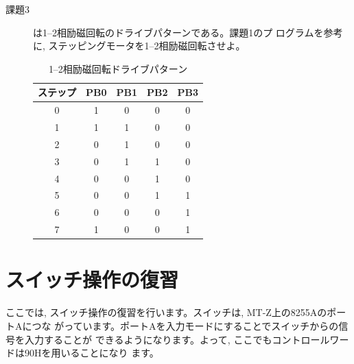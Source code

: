\begin{description}
\item[課題3] は1--2相励磁回転のドライブパターンである。課題1のプ
           ログラムを参考に, ステッピングモータを1--2相励磁回転させよ。

\begin{table}
\begin{center}
\caption{1--2相励磁回転ドライブパターン}
\label{tab:12sou}
\footnotesize
\begin{tabular}{|c|c|c|c|c|}
\hline
ステップ&PB0& PB1&  PB2&  PB3\\ \hline
       0&  1&   0&    0&    0\\ \hline
       1&  1&   1&    0&    0\\ \hline
       2&  0&   1&    0&    0\\ \hline
       3&  0&   1&    1&    0\\ \hline
       4&  0&   0&    1&    0\\ \hline
       5&  0&   0&    1&    1\\ \hline
       6&  0&   0&    0&    1\\ \hline
       7&  1&   0&    0&    1\\
\hline
\end{tabular}
\end{center}
\end{table}

\end{description}

\section{スイッチ操作の復習}

ここでは, スイッチ操作の復習を行います。スイッチは, MT-Z上の8255AのポートAにつな
がっています。ポートAを入力モードにすることでスイッチからの信号を入力することが
できるようになります。よって, ここでもコントロールワードは90Hを用いることになり
ます。


